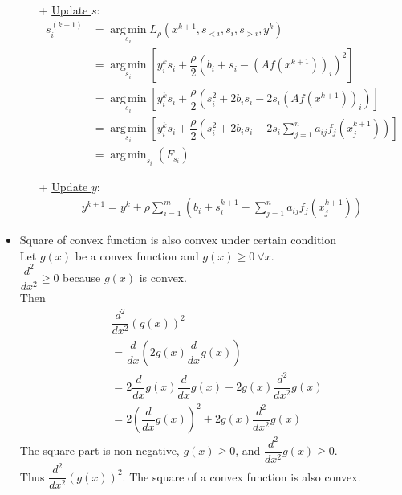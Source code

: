 \documentclass{article}
\DeclareMathOperator*{\argmin}{arg\,min}
\begin{document}
\begin{itemize}
\begin{itemize}
    \item[+] \underline{Update $s$}:
    \begin{align*}
    s_i^{(k+1)} &= \argmin\limits_{s_i} L_{\rho}(x^{k+1},s_{<i},s_i,s_{>i},y^k) \\
    &= \argmin\limits_{s_i} \left[y_i^k s_i + \dfrac{\rho}{2}(b_i + s_i - (Af(x^{k+1}))_i)^2\right]\\
    &= \argmin\limits_{s_i} \left[y_i^k s_i + \dfrac{\rho}{2}(s_i^2 + 2b_is_i - 2s_i(Af(x^{k+1}))_i)\right]\\
    &= \argmin\limits_{s_i}\left[y_i^k s_i + \dfrac{\rho}{2}\left(s_i^2+2b_is_i - 2s_i\sum\limits_{j=1}^n a_{ij}f_j(x_j^{k+1})\right) \right]\\
    &= \argmin_{s_i} (F_{s_i})
    \end{align*}
    \item[+] \underline{Update $y$}: 
    \begin{align*}
        y^{k+1} = y^k + \rho \sum\limits_{i=1}^m \left(b_i+s_i^{k+1}-\sum\limits_{j=1}^na_{ij}f_j(x_j^{k+1})\right)
    \end{align*}
\end{itemize}
\item Square of convex function is also convex under certain condition\\
Let $g(x)$ be a convex function and $g(x)\ge 0\ \forall x$.\\
$\dfrac{d^2}{dx^2} \ge 0$ because $g(x)$ is convex.\\
Then \begin{align*}
    &\dfrac{d^2}{dx^2}(g(x))^2\\
    &=\dfrac{d}{dx} \left( 2g(x) \dfrac{d}{dx} g(x) \right)\\
    &=2\dfrac{d}{dx}g(x)\dfrac{d}{dx}g(x)+2g(x)\dfrac{d^2}{dx^2}g(x)\\
    &=2\left( \dfrac{d}{dx}g(x)\right)^2+2g(x)\dfrac{d^2}{dx^2}g(x)
\end{align*}
The square part is non-negative, $g(x)\ge 0$, and $\dfrac{d^2}{dx^2}g(x) \ge 0$. \\
Thus $\dfrac{d^2}{dx^2}(g(x))^2$. The square of a convex function is also convex. 



\end{itemize}
\end{document}
